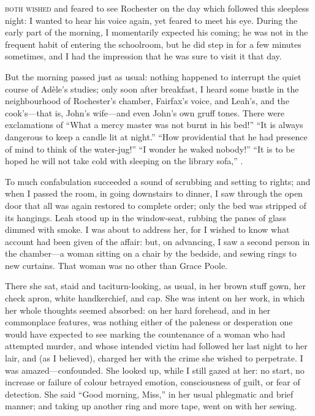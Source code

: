 
 \textsc{both wished} and feared to see \Mr{} Rochester on the day which followed
this sleepless night: I wanted to hear his voice again, yet feared to
meet his eye.  During the early part of the morning, I momentarily
expected his coming; he was not in the frequent habit of entering the
schoolroom, but he did step in for a few minutes sometimes, and I had
the impression that he was sure to visit it that day.

But the morning passed just as usual: nothing happened to interrupt the
quiet course of Adèle's studies; only soon after breakfast, I heard some
bustle in the neighbourhood of \Mr{} Rochester's chamber, \Mrs{} Fairfax's
voice, and Leah's, and the cook's---that is, John's wife---and even
John's own gruff tones.  There were exclamations of \enquote{What a
mercy master was not burnt in his bed!}  \enquote{It is always dangerous
to keep a candle lit at night.}  \enquote{How providential that he had
presence of mind to think of the water-jug!}  \enquote{I wonder he waked
nobody!}  \enquote{It is to be hoped he will not take cold with sleeping
on the library sofa,} \etc.

To much confabulation succeeded a sound of scrubbing and setting to
rights; and when I passed the room, in going downstairs to dinner, I saw
through the open door that all was again restored to complete order;
only the bed was stripped of its hangings.  Leah stood up in the
window-seat, rubbing the panes of glass dimmed with smoke.  I was about
to address her, for I wished to know what account had been given of the
affair: but, on advancing, I saw a second person in the chamber---a
woman sitting on a chair by the bedside, and sewing rings to new
curtains.  That woman was no other than Grace Poole.

There she sat, staid and taciturn-looking, as usual, in her brown stuff
gown, her check apron, white handkerchief, and cap.  She was intent on
her work, in which her whole thoughts seemed absorbed: on her hard
forehead, and in her commonplace features, was nothing either of the
paleness or desperation one would have expected to see marking the
countenance of a woman who had attempted murder, and whose intended
victim had followed her last night to her lair, and (as I believed),
charged her with the crime she wished to perpetrate.  I was
amazed---confounded.  She looked up, while I still gazed at her: no
start, no increase or failure of colour betrayed emotion, consciousness
of guilt, or fear of detection.  She said \enquote{Good morning, Miss,}
in her usual phlegmatic and brief manner; and taking up another ring and
more tape, went on with her sewing.

